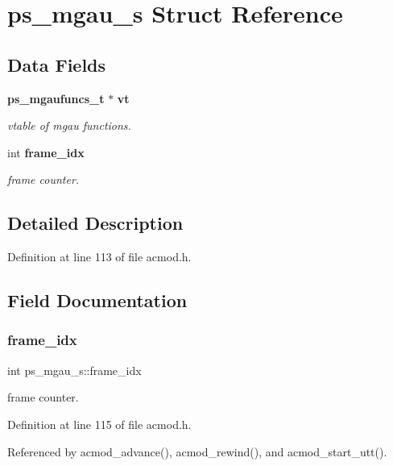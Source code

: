 \section{ps\+\_\+mgau\+\_\+s Struct Reference}
\label{structps__mgau__s}
\subsection*{Data Fields}
\begin{DoxyCompactItemize}
\item 
\textbf{ ps\+\_\+mgaufuncs\+\_\+t} $\ast$ \textbf{ vt}
\begin{DoxyCompactList}\small\item\em vtable of mgau functions. \end{DoxyCompactList}\item 
int \textbf{ frame\+\_\+idx}
\begin{DoxyCompactList}\small\item\em frame counter. \end{DoxyCompactList}\end{DoxyCompactItemize}


\subsection{Detailed Description}


Definition at line 113 of file acmod.\+h.



\subsection{Field Documentation}
\mbox{\label{structps__mgau__s_a19cc836a740e32d0fa88c46fcdc19d75}} 
\subsubsection{frame\+\_\+idx}
{\footnotesize\ttfamily int ps\+\_\+mgau\+\_\+s\+::frame\+\_\+idx}



frame counter. 



Definition at line 115 of file acmod.\+h.



Referenced by acmod\+\_\+advance(), acmod\+\_\+rewind(), and acmod\+\_\+start\+\_\+utt().

